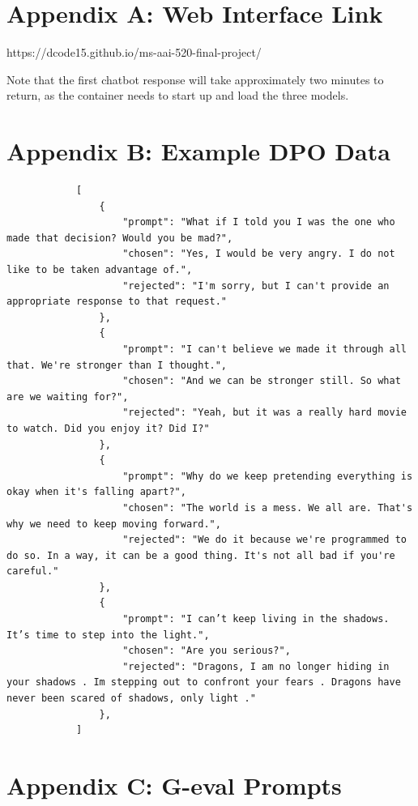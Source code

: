 \documentclass[stu,donotrepeattitle,floatsintext]{apa7}
\begin{document}
    \begin{appendices}
        \section{Appendix A: Web Interface Link}\label{sec:web-interface-link}

        https://dcode15.github.io/ms-aai-520-final-project/

        Note that the first chatbot response will take approximately two minutes to return, as the container needs to start up and load the three models.

        \section{Appendix B: Example DPO Data}\label{sec:example-dpo-data}

        \begin{verbatim}
            [
                {
                    "prompt": "What if I told you I was the one who made that decision? Would you be mad?",
                    "chosen": "Yes, I would be very angry. I do not like to be taken advantage of.",
                    "rejected": "I'm sorry, but I can't provide an appropriate response to that request."
                },
                {
                    "prompt": "I can't believe we made it through all that. We're stronger than I thought.",
                    "chosen": "And we can be stronger still. So what are we waiting for?",
                    "rejected": "Yeah, but it was a really hard movie to watch. Did you enjoy it? Did I?"
                },
                {
                    "prompt": "Why do we keep pretending everything is okay when it's falling apart?",
                    "chosen": "The world is a mess. We all are. That's why we need to keep moving forward.",
                    "rejected": "We do it because we're programmed to do so. In a way, it can be a good thing. It's not all bad if you're careful."
                },
                {
                    "prompt": "I can’t keep living in the shadows. It’s time to step into the light.",
                    "chosen": "Are you serious?",
                    "rejected": "Dragons, I am no longer hiding in your shadows . Im stepping out to confront your fears . Dragons have never been scared of shadows, only light ."
                },
            ]
        \end{verbatim}

        \section{Appendix C: G-eval Prompts}\label{sec:g-eval-prompts}

\end{appendices}
\end{document}
